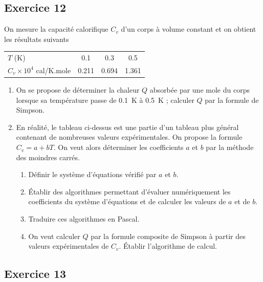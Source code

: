 \subsection*{Exercice 12}

On mesure la capacité calorifique $C_v$ d'un corps à volume constant et on
obtient les résultats suivants
\begin{center}
  \begin{tabular}{lccc}
    $T$ (K) & 0.1 & 0.3 & 0.5\\
    $C_v \times 10^4$ cal/K.mole & 0.211 & 0.694 & 1.361
  \end{tabular}
\end{center}
\begin{enumerate}[label=\arabic*-]
  \item On se propose de déterminer la chaleur $Q$ absorbée par une mole du
        corps lorsque sa température passe de 0.1~K à 0.5~K ; calculer $Q$ par
        la formule de Simpson.
  \item En réalité, le tableau ci-dessus est une partie d'un tableau plus
        général contenant de nombreuses valeurs expérimentales. On propose la
        formule $C_v = a + bT$. On veut alors déterminer les coefficients $a$
        et $b$ par la méthode des moindres carrés.
        \begin{enumerate}[label=\alph*-]
          \item Définir le système d'équations vérifié par $a$ et $b$.
          \item Établir des algorithmes permettant d'évaluer numériquement les
                coefficients du système d'équations et de calculer les
                valeurs de $a$ et de $b$.
          \item Traduire ces algorithmes en Pascal.
          \item On veut calculer $Q$ par la formule composite de Simpson à
                partir des valeurs expérimentales de $C_v$. Établir
                l'algorithme de calcul.
        \end{enumerate}
\end{enumerate}

\subsection*{Exercice 13}

